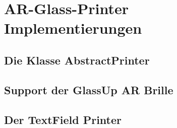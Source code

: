 \chapter{AR-Glass-Printer Implementierungen}

\section{Die Klasse AbstractPrinter}
\section{Support der GlassUp AR Brille}
\section{Der TextField Printer}
